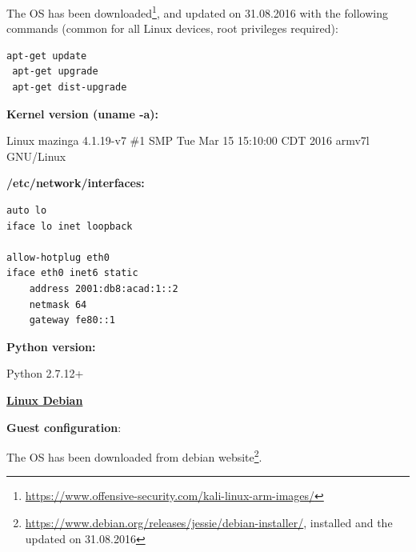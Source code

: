 \documentclass[12pt]{article}
\begin{document}
The OS has been downloaded\footnote{\url{https://www.offensive-security.com/kali-linux-arm-images/}}, and updated on 31.08.2016 with the following commands (common for all Linux devices, root privileges required):
\begin{lstlisting}[style=python,basicstyle=\ttfamily\scriptsize]
 apt-get update
 apt-get upgrade
 apt-get dist-upgrade
\end{lstlisting}

\vspace{-10pt}
\textbf{Kernel version (uname -a):}

\vspace{-10pt}
Linux mazinga 4.1.19-v7 \#1 SMP Tue Mar 15 15:10:00 CDT 2016 armv7l GNU/Linux


\textbf{/etc/network/interfaces:}

\vspace{-5pt}
\begin{lstlisting}[style=python,basicstyle=\ttfamily\scriptsize]
auto lo
iface lo inet loopback

allow-hotplug eth0
iface eth0 inet6 static
	address 2001:db8:acad:1::2
	netmask 64
	gateway fe80::1
\end{lstlisting}

\textbf{Python version:} 

\vspace{-10pt}
Python 2.7.12+

\textbf{\underline{Linux Debian}}

\vspace{-10pt}
\textbf{Guest configuration}:

\begin{savenotes}
\begin{table}[!htpb]
\centering
\addtolength{\tabcolsep}{1pt}
\noindent{}
\caption{Linux Debian}
\label{table:linuxDeb}
\end{table}
\end{savenotes}

The OS has been downloaded from debian website\footnote{\label{deb1}\url{https://www.debian.org/releases/jessie/debian-installer/}, installed and the updated on 31.08.2016}.
\end{document}
